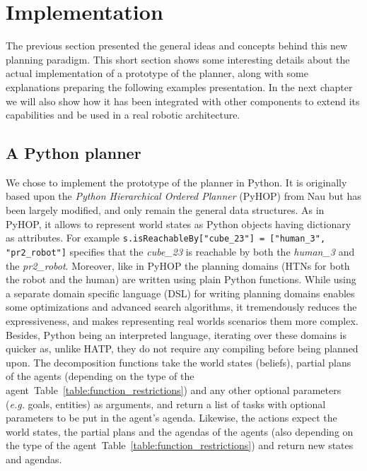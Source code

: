 \documentclass[a4paper,11pt,twoside]{StyleThese}
\begin{document}
\section{Implementation}
The previous section presented the general ideas and concepts behind this new planning paradigm. This short section shows some interesting details about the actual implementation of a prototype of the planner, along with some explanations preparing the following examples presentation. In the next chapter we will also show how it has been integrated with other components to extend its capabilities and be used in a real robotic architecture.

\subsection{A Python planner}
We chose to implement the prototype of the planner in Python. It is originally based upon the \textit{Python Hierarchical Ordered Planner} (PyHOP) from Nau but has been largely modified, and only remain the general data structures. As in PyHOP, it allows to represent world states as Python objects having dictionary as attributes. For example \verb|s.isReachableBy["cube_23"] = ["human_3", "pr2_robot"]| specifies that the \textit{cube\_23} is reachable by both the \textit{human\_3} and the \textit{pr2\_robot}. 
Moreover, like in PyHOP the planning domains (HTNs for both the robot and the human) are written using plain Python functions. While using a separate domain specific language (DSL) for writing planning domains enables some optimizations and advanced search algorithms, it tremendously reduces the expressiveness, and makes representing real worlds scenarios them more complex. Besides, Python being an interpreted language, iterating over these domains is quicker as, unlike HATP, they do not require any compiling before being planned upon.
The decomposition functions take the world states (beliefs), partial plans of the agents (depending on the type of the agent~Table~\ref{table:function_restrictions}) and any other optional parameters (\textit{e.g.} goals, entities) as arguments, and return a list of tasks with optional parameters to be put in the agent's agenda. Likewise, the actions expect the world states, the partial plans and the agendas of the agents (also depending on the type of the agent~Table~\ref{table:function_restrictions}) and return new states and agendas.
\end{document}
